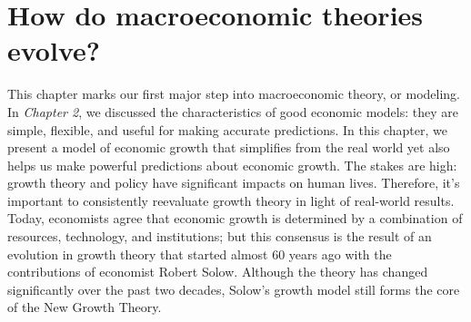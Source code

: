 \documentclass[11pt]{article} %
\begin{document}
\section*{\textbf{How do macroeconomic theories evolve?}}
This chapter marks our first major step into macroeconomic theory, or modeling. In \textit{Chapter 2}, we discussed the characteristics of good economic models: they are simple, flexible, and useful for making accurate predictions. In this chapter, we present a model of economic growth that simplifies from the real world yet also helps us make powerful predictions about economic growth. The stakes are high: growth theory and policy have significant impacts on human lives. Therefore, it's important to consistently reevaluate growth theory in light of real-world results.
Today, economists agree that economic growth is determined by a combination of resources, technology, and institutions; but this consensus is the result of an evolution in growth theory that started almost 60 years ago with the contributions of economist Robert Solow. Although the theory has changed significantly over the past two decades, Solow's growth model still forms the core of the New Growth Theory.
\end{document}
